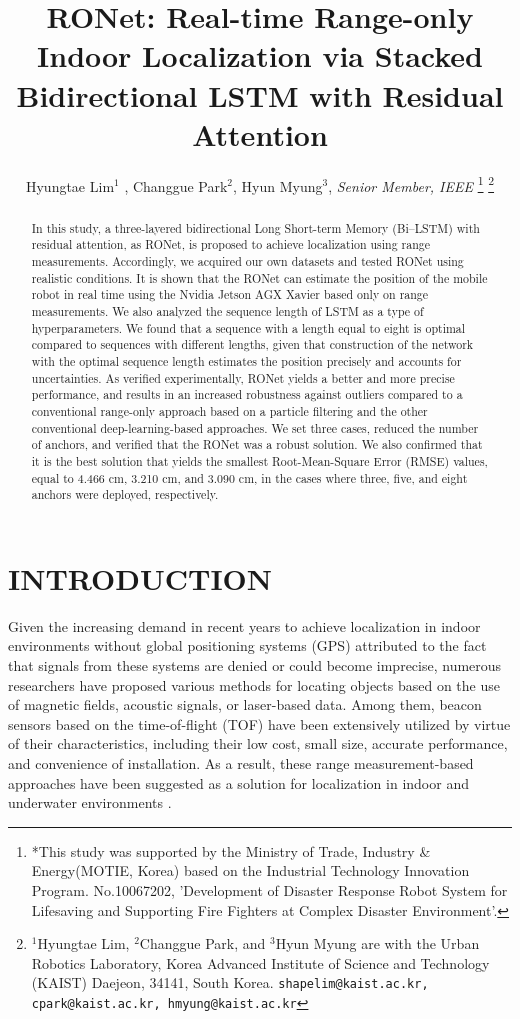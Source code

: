 \documentclass[letterpaper, 10 pt, conference]{ieeeconf}
\title{\LARGE \bf
RONet: Real-time Range-only Indoor Localization via Stacked Bidirectional LSTM with Residual Attention}
\author{Hyungtae Lim$^{1}$ , Changgue Park$^{2}$, Hyun Myung$^{3}$, \textit{Senior Member, IEEE}%
\thanks{
	*This study was supported by the Ministry of Trade, Industry \& Energy(MOTIE, Korea) based on the Industrial Technology Innovation Program. No.10067202, 'Development of Disaster Response Robot System for Lifesaving and Supporting Fire Fighters at Complex Disaster Environment'.}%
\thanks{$^{1}$Hyungtae Lim, $^{2}$Changgue Park, and $^{3}$Hyun Myung are with
	the Urban Robotics Laboratory, Korea Advanced Institute of Science
	and Technology (KAIST) Daejeon, 34141, South Korea. {\tt\small shapelim@kaist.ac.kr, cpark@kaist.ac.kr, hmyung@kaist.ac.kr}}%
%
}
\begin{document}

\maketitle
\thispagestyle{empty}
\pagestyle{empty}

\begin{abstract}

In this study, a three-layered bidirectional Long Short-term Memory (Bi--LSTM) with residual attention, as RONet, is proposed to achieve localization using range measurements. Accordingly, we acquired our own datasets and tested RONet using realistic conditions. It is shown that the RONet can estimate the position of the mobile robot in real time using the Nvidia Jetson AGX Xavier based only on range measurements. We also analyzed the sequence length of LSTM as a type of hyperparameters. We found that a sequence with a length equal to eight is optimal compared to sequences with different lengths, given that construction of the network with the optimal sequence length estimates the position precisely and accounts for uncertainties. As verified experimentally, RONet yields a better and more precise performance, and results in an increased robustness against outliers compared to a conventional range-only approach based on a particle filtering and the other conventional deep-learning-based approaches. We set three cases, reduced the number of anchors, and verified that the RONet was a robust solution. We also confirmed that it is the best solution that yields the smallest Root-Mean-Square Error (RMSE) values, equal to 4.466 cm, 3.210 cm, and 3.090 cm, in the cases where three, five, and eight anchors were deployed, respectively.   

\end{abstract}

\section{INTRODUCTION}

Given the increasing demand in recent years to achieve localization in indoor environments without global positioning systems (GPS) attributed to the fact that signals from these systems are denied or could become imprecise, numerous researchers have proposed various methods for locating objects based on the use of magnetic fields, acoustic signals, or laser-based data\cite{jung2015magnetic,medina2013ultrasound,li2014lidar}. Among them, beacon sensors based on the time-of-flight (TOF) have been extensively utilized by virtue of their characteristics, including their low cost, small size, accurate performance, and convenience of installation. As a result, these range measurement-based approaches have been suggested as a solution for localization in indoor \cite{peneda2009trilateration,jung2011indoor} and underwater environments \cite{newman2003pure, olson2006robust}.
\end{document}
